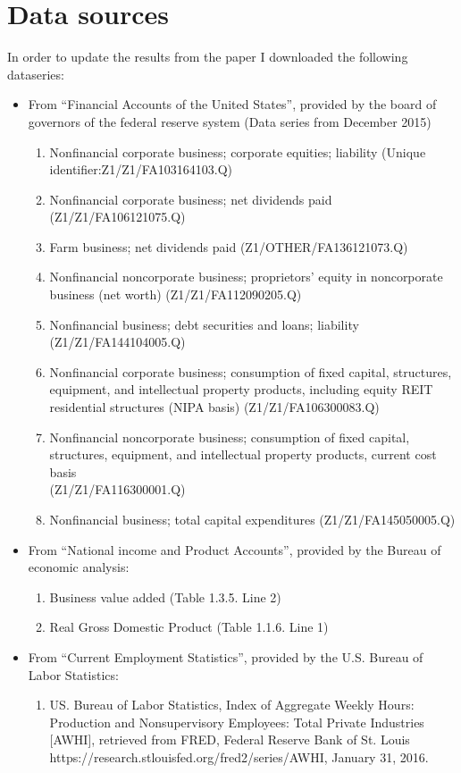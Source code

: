 \section{Data sources}
\label{sub:data_sources}

In order to update the results from the paper I downloaded the following
dataseries:
\begin{itemize}
\item From ``Financial Accounts of the United States'', provided by the board
  of governors of the federal reserve system (Data series from December 2015)
  \begin{enumerate}
  \item Nonfinancial corporate business; corporate equities; liability (Unique
    identifier:Z1/Z1/FA103164103.Q)
  \item Nonfinancial corporate business; net dividends paid
    (Z1/Z1/FA106121075.Q)
  \item Farm business; net dividends paid (Z1/OTHER/FA136121073.Q)
  \item Nonfinancial noncorporate business; proprietors' equity in noncorporate
    business (net worth) (Z1/Z1/FA112090205.Q)
  \item Nonfinancial business; debt securities and loans; liability\\
    (Z1/Z1/FA144104005.Q)
  \item Nonfinancial corporate business; consumption of fixed capital,
    structures, equipment, and intellectual property products, including equity
    REIT residential structures (NIPA basis) (Z1/Z1/FA106300083.Q)
  \item Nonfinancial noncorporate business; consumption of fixed capital,
    structures, equipment, and intellectual property products, current cost
    basis\\
    (Z1/Z1/FA116300001.Q)
  \item Nonfinancial business; total capital expenditures (Z1/Z1/FA145050005.Q)
  \end{enumerate}
\item From ``National income and Product Accounts'', provided by the Bureau of
  economic analysis:
  \begin{enumerate}
  \item Business value added (Table 1.3.5. Line 2)
  \item Real Gross Domestic Product (Table 1.1.6. Line 1)
  \end{enumerate}
\item From ``Current Employment Statistics'', provided by the U.S. Bureau of
  Labor Statistics:
  \begin{enumerate}
  \item US. Bureau of Labor Statistics, Index of Aggregate Weekly Hours:
    Production and Nonsupervisory Employees: Total Private Industries [AWHI],
    retrieved from FRED, Federal Reserve Bank of St. Louis
    https://research.stlouisfed.org/fred2/series/AWHI, January 31, 2016.
  \end{enumerate}
\end{itemize}

